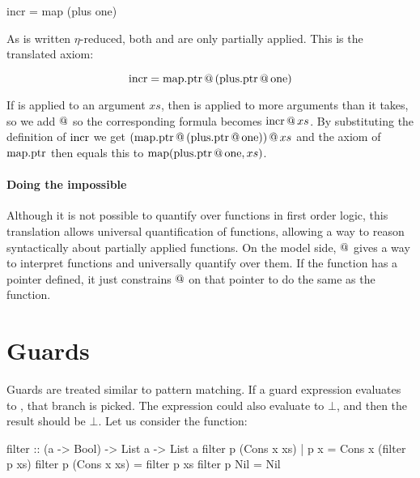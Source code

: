 \begin{code}
incr = map (plus one)
\end{code}

As  is written $\eta$-reduced, both  and 
are only partially applied. This is the translated axiom:

\begin{equation*}
\mathrm{incr} = \mathrm{map.ptr} \, @ \, (\mathrm{plus.ptr} \, @ \, \mathrm{one})
\end{equation*}

If  is applied to an argument $xs$, then  is applied
to more arguments than it takes, so we add $@$ so the
corresponding formula becomes $\mathrm{incr} \, @ \, xs$. By substituting
the definition of $\mathrm{incr}$ we get
$(\mathrm{map.ptr} \, @ \, (\mathrm{plus.ptr} \, @ \, \mathrm{one})) \, @ \, xs$ and
the axiom of $\mathrm{map.ptr}$ then equals this to
$\mathrm{map}(\mathrm{plus.ptr} \, @ \, \mathrm{one},xs)$.

\paragraph{Doing the impossible}
Although it is not possible to quantify over functions in first order
logic, this translation allows universal quantification of functions,
allowing a way to reason syntactically about partially applied
functions. On the model side, $@$ gives a way to interpret
functions and universally quantify over them. If the function has a
pointer defined, it just constrains $@$ on that pointer to do the
same as the function.

\section{Guards}

Guards are treated similar to pattern matching. If a guard expression
evaluates to , that branch is picked. The expression could
also evaluate to $\bot$, and then the result should be $\bot$. Let us
consider the  function:

\begin{code}
filter :: (a -> Bool) -> List a -> List a
filter p (Cons x xs) | p x = Cons x (filter p xs)
filter p (Cons x xs)       = filter p xs
filter p Nil               = Nil
\end{code}


